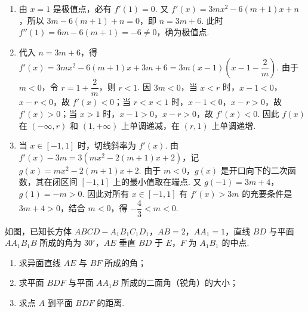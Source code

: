 \begin{solution}
\begin{enumerate}
\item
由 \(x=1\) 是极值点，必有 \(f'(1)=0\). 又
\(f'(x)=3mx^2-6(m+1)x+n\)，所以 \(3m-6(m+1)+n=0\)，即
\(n=3m+6\). 此时 \(f''(1)=6m-6(m+1)=-6\neq0\)，确为极值点.

\item
代入 \(n=3m+6\)，得
\(f'(x)=3mx^2-6(m+1)x+3m+6=3m(x-1)\left(x-1-\dfrac{2}{m}\right)\). 由于 \(m<0\)，令 \(r=1+\dfrac{2}{m}\)，则 \(r<1\). 因 \(3m<0\)，当 \(x<r\) 时，\(x-1<0\)，\(x-r<0\)，故 \(f'(x)<0\)；当 \(r<x<1\) 时，\(x-1<0\)，\(x-r>0\)，故 \(f'(x)>0\)；当 \(x>1\) 时，\(x-1>0\)，\(x-r>0\)，故 \(f'(x)<0\). 因此 \(f(x)\) 在 \(\left(-\infty,r\right)\) 和 \((1,+\infty)\) 上单调递减，在 \((r,1)\) 上单调递增.

\item
当 \(x\in[-1,1]\) 时，切线斜率为 \(f'(x)\). 由
\(f'(x)-3m=3\left(mx^2-2(m+1)x+2\right)\)，记 \(g(x)=mx^2-2(m+1)x+2\). 由于 \(m<0\)，\(g(x)\) 是开口向下的二次函数，其在闭区间 \([-1,1]\) 上的最小值取在端点. 又
\(g(-1)=3m+4\)，\(g(1)=-m>0\). 因此对所有 \(x\in[-1,1]\) 有 \(f'(x)>3m\) 的充要条件是 \(3m+4>0\)，结合 \(m<0\)，得
\(-\dfrac{4}{3}<m<0\).
\end{enumerate}
\end{solution}

\begin{problem}
如图，已知长方体 \(ABCD-A_{1}B_{1}C_{1}D_{1}\)，\(AB=2\)，\(AA_{1}=1\)，直线 \(BD\) 与平面 \(AA_{1}B_{1}B\) 所成的角为 \(30^{\circ}\)，\(AE\) 垂直 \(BD\) 于 \(E\)，\(F\) 为 \(A_{1}B_{1}\) 的中点.

\begin{enumerate}
\item 求异面直线 \(AE\) 与 \(BF\) 所成的角；
\item 求平面 \(BDF\) 与平面 \(AA_{1}B\) 所成的二面角（锐角）的大小；
\item 求点 \(A\) 到平面 \(BDF\) 的距离.
\end{enumerate}

\end{problem}

